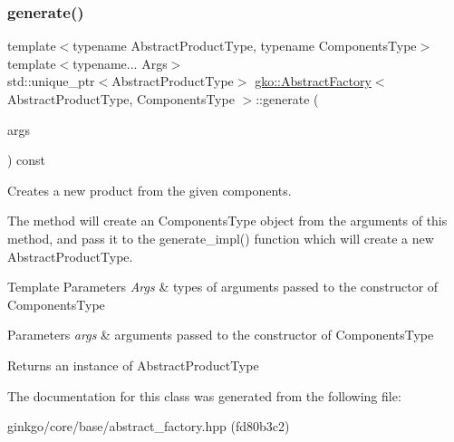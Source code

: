 \subsubsection{\texorpdfstring{generate()}{generate()}}
{\footnotesize\ttfamily template$<$typename Abstract\+Product\+Type, typename Components\+Type$>$ \\
template$<$typename... Args$>$ \\
std\+::unique\+\_\+ptr$<$Abstract\+Product\+Type$>$ \hyperlink{classgko_1_1AbstractFactory}{gko\+::\+Abstract\+Factory}$<$ Abstract\+Product\+Type, Components\+Type $>$\+::generate (\begin{DoxyParamCaption}\item[{Args \&\&...}]{args }\end{DoxyParamCaption}) const\hspace{0.3cm}{\ttfamily [inline]}}



Creates a new product from the given components. 

The method will create an Components\+Type object from the arguments of this method, and pass it to the generate\+\_\+impl() function which will create a new Abstract\+Product\+Type.


\begin{DoxyTemplParams}{Template Parameters}
{\em Args} & types of arguments passed to the constructor of Components\+Type\\
\hline
\end{DoxyTemplParams}

\begin{DoxyParams}{Parameters}
{\em args} & arguments passed to the constructor of Components\+Type\\
\hline
\end{DoxyParams}
\begin{DoxyReturn}{Returns}
an instance of Abstract\+Product\+Type 
\end{DoxyReturn}


The documentation for this class was generated from the following file\+:\begin{DoxyCompactItemize}
\item 
ginkgo/core/base/abstract\+\_\+factory.\+hpp (fd80b3c2)\end{DoxyCompactItemize}
